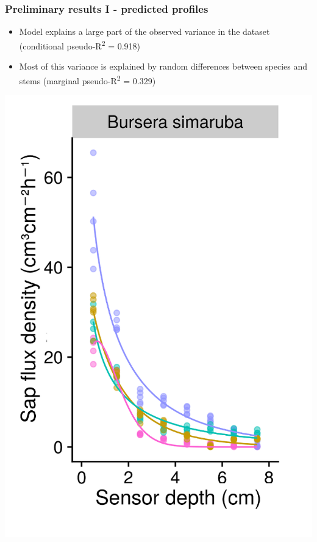 \documentclass[usepdftitle=false]{beamer}
\newcommand{\Sup}[1]{\textsuperscript{#1}}
\newcommand{\tw}{\textwidth}
\begin{document}
\begin{frame}
	\frametitle{Preliminary results I - predicted profiles}	
	\begin{minipage}{0.6\tw}
		\begin{itemize}[<+-| alert@+>]
			\item Model explains a large part of the observed variance in the dataset (conditional pseudo-R\Sup{2} = 0.918)
			\item Most of this variance is explained by random differences between species and stems (marginal pseudo-R\Sup{2} = 0.329)
		\end{itemize}						
	\end{minipage}
	\begin{minipage}{0.38\tw}
		\includegraphics[width = \tw]{figures/HFD_05_profile_simarouba.png}
	\end{minipage}	
\end{frame}
\end{document}
